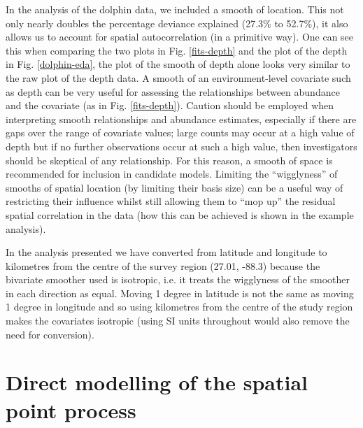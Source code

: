 \documentclass[a4paper,12pt]{article}
\begin{document}
In the analysis of the dolphin data, we included a smooth of location. This not only nearly doubles the percentage deviance explained (27.3\% to 52.7\%), it also allows us to account for spatial autocorrelation (in a primitive way). One can see this when comparing the two plots in Fig. \ref{fits-depth} and the plot of the depth in Fig. \ref{dolphin-eda}, the plot of the smooth of depth alone looks very similar to the raw plot of the depth data. A smooth of an environment-level covariate such as depth can be very useful for assessing the relationships between abundance and the covariate (as in Fig. \ref{fits-depth}). Caution should be employed when interpreting smooth relationships and abundance estimates, especially if there are gaps over the range of covariate values; large counts may occur at a high value of depth but if no further observations occur at such a high value, then investigators should be skeptical of any relationship. For this reason, a smooth of space is recommended for inclusion in candidate models. Limiting the ``wigglyness'' of smooths of spatial location (by limiting their basis size) can be a useful way of restricting their influence whilst still allowing them to ``mop up'' the residual spatial correlation in the data (how this can be achieved is shown in the example analysis).


%

In the analysis presented we have converted from latitude and longitude to kilometres from the centre of the survey region (27.01, -88.3) because the bivariate smoother used \citep[the thin plate spline;][]{Wood:2003tc} is isotropic, i.e. it treats the wigglyness of the smoother in each direction as equal. Moving 1 degree in latitude is not the same as moving 1 degree in longitude and so using kilometres from the centre of the study region makes the covariates isotropic (using SI units throughout would also remove the need for conversion).



\section*{Direct modelling of the spatial point process}
\label{s:direct}
\end{document}
